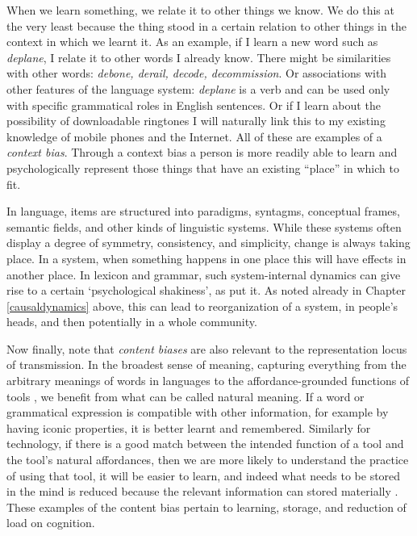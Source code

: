 When we learn something, we relate it to other things we know. We do this at the 
very least because the thing stood in a certain relation to other things in the context 
in which we learnt it. As an example, if I learn a new word such as 
\textit{deplane}, I relate it to other words I already know. There might be similarities with other words: \textit{debone, derail, decode, decommission}. Or associations with other features of the language system: \textit{deplane} is a verb and 
can be used only with specific grammatical roles in English sentences. 
Or if I learn about the possibility of downloadable ringtones I will 
naturally link this to my existing knowledge of mobile 
phones and the Internet. All of these are examples of a \textit{context bias}. Through a context bias  a person is more readily able 
to learn and psychologically represent those things that have an 
existing ``place'' in which to fit. 



In language, items are structured into paradigms, syntagms, conceptual frames, semantic fields, and other kinds of linguistic systems. While these systems often display a degree of symmetry, 
consistency, and simplicity, change is always taking place. In a system, when something happens in one place 
this will have effects in another place. In lexicon and grammar, such system-internal 
dynamics can give rise to a certain \textquoteleft psychological 
shakiness', as \citet{sapir_language:_1921} put it. As noted already in Chapter \ref{causaldynamics} above, this can lead to reorganization of 
a system, in people's heads, and then potentially in a whole community.



Now finally, note that \textit{content biases}  are also relevant to the representation locus of transmission. In the broadest sense of meaning, capturing everything from the 
arbitrary meanings of words in languages to the affordance-grounded 
functions of tools \citep{kockelman_residence_2006}, we benefit from what can be called 
natural meaning. If a word or grammatical expression is compatible with 
other information, for example by having iconic properties, it is better 
learnt and remembered. Similarly for technology, if there is a good match between the intended function of a tool and the tool's natural affordances, then we are more likely to understand the practice of using that tool, it 
will be easier to learn, and indeed what needs to be stored 
in the mind is reduced because the relevant information can 
stored materially \citep{norman_cognitive_1991}. These examples of the content bias pertain to learning, storage, and 
reduction of load on cognition. 


